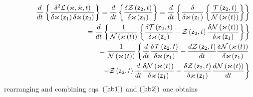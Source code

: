 \begin{eqnarray}
&&\frac{d}{dt}\left\{ \frac{\delta ^{2}{\cal L}\left( \varkappa ,\dot{%
\varkappa},t\right) }{\delta \varkappa \left( {\sf z}_{1}\right) \delta \dot{%
\varkappa}\left( {\sf z}_{2}\right) }\right\} =\frac{d}{dt}\left\{ \frac{%
\delta {\cal Z}\left( {\sf z}_{2},t\right) }{\delta \varkappa \left( {\sf z}%
_{1}\right) }\right\} =\frac{d}{dt}\left\{ \frac{\delta }{\delta \varkappa
\left( {\sf z}_{1}\right) }\left\{ \frac{{\cal T}\left( {\sf z}_{2},t\right) 
}{{\cal N}\left( {\cal \varkappa }\left( t\right) \right) }\right\} \right\}
\nonumber \\
&&\left. {}\right. =\frac{d}{dt}\left\{ \frac{1}{{\cal N}\left( {\cal %
\varkappa }\left( t\right) \right) }\left\{ \frac{\delta {\cal T}\left( {\sf %
z}_{2},t\right) }{\delta \varkappa \left( {\sf z}_{1}\right) }-{\cal Z}%
\left( {\sf z}_{2},t\right) \frac{\delta {\cal N}\left( {\cal \varkappa }%
\left( t\right) \right) }{\delta \varkappa \left( {\sf z}_{1}\right) }%
\right\} \right\}  \nonumber \\
&&\left. {}\right. =\frac{1}{{\cal N}\left( {\cal \varkappa }\left( t\right)
\right) }\left\{ \frac{d}{dt}\frac{\delta {\cal T}\left( {\sf z}%
_{2},t\right) }{\delta \varkappa \left( {\sf z}_{1}\right) }-\frac{d{\cal Z}%
\left( {\sf z}_{2},t\right) }{dt}\frac{\delta {\cal N}\left( {\cal \varkappa 
}\left( t\right) \right) }{\delta \varkappa \left( {\sf z}_{1}\right) }%
\right.  \nonumber \\
&&\left. {}\right. \qquad \qquad \qquad \qquad \qquad \qquad \left. -{\cal Z}%
\left( {\sf z}_{2},t\right) \frac{d}{dt}\frac{\delta {\cal N}\left( {\cal %
\varkappa }\left( t\right) \right) }{\delta \varkappa \left( {\sf z}%
_{1}\right) }-\frac{\delta {\cal Z}\left( {\sf z}_{2},t\right) }{\delta
\varkappa \left( {\sf z}_{1}\right) }\frac{d{\cal N}\left( {\cal \varkappa }%
\left( t\right) \right) }{dt}\right\}  \label{hb2}
\end{eqnarray}%
rearranging and combining eqs. $\left( \ref{hb1}\right) $ and $\left( \ref%
{hb2}\right) $ one obtains 
